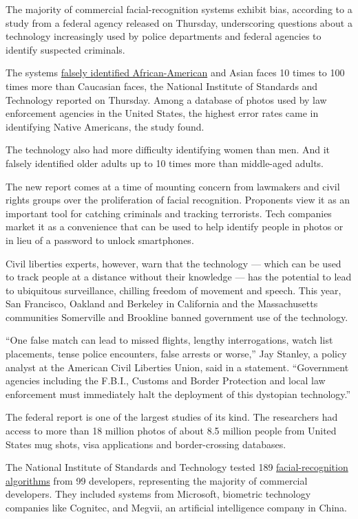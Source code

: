 The majority of commercial facial-recognition systems exhibit bias,
according to a study from a federal agency released on Thursday,
underscoring questions about a technology increasingly used by police
departments and federal agencies to identify suspected criminals.

The systems
\href{https://www.nytimes3xbfgragh.onion/2019/07/08/us/detroit-facial-recognition-cameras.html}{falsely
identified African-American} and Asian faces 10 times to 100 times more
than Caucasian faces, the National Institute of Standards and Technology
reported on Thursday. Among a database of photos used by law enforcement
agencies in the United States, the highest error rates came in
identifying Native Americans, the study found.

The technology also had more difficulty identifying women than men. And
it falsely identified older adults up to 10 times more than middle-aged
adults.

The new report comes at a time of mounting concern from lawmakers and
civil rights groups over the proliferation of facial recognition.
Proponents view it as an important tool for catching criminals and
tracking terrorists. Tech companies market it as a convenience that can
be used to help identify people in photos or in lieu of a password to
unlock smartphones.

Civil liberties experts, however, warn that the technology --- which can
be used to track people at a distance without their knowledge --- has
the potential to lead to ubiquitous surveillance, chilling freedom of
movement and speech. This year, San Francisco, Oakland and Berkeley in
California and the Massachusetts communities Somerville and Brookline
banned government use of the technology.

``One false match can lead to missed flights, lengthy interrogations,
watch list placements, tense police encounters, false arrests or
worse,'' Jay Stanley, a policy analyst at the American Civil Liberties
Union, said in a statement. ``Government agencies including the F.B.I.,
Customs and Border Protection and local law enforcement must immediately
halt the deployment of this dystopian technology.''

The federal report is one of the largest studies of its kind. The
researchers had access to more than 18 million photos of about 8.5
million people from United States mug shots, visa applications and
border-crossing databases.

The National Institute of Standards and Technology tested 189
\href{https://www.nytimes3xbfgragh.onion/2019/01/24/technology/amazon-facial-technology-study.html}{facial-recognition
algorithms} from 99 developers, representing the majority of commercial
developers. They included systems from Microsoft, biometric technology
companies like Cognitec, and Megvii, an artificial intelligence company
in China.


